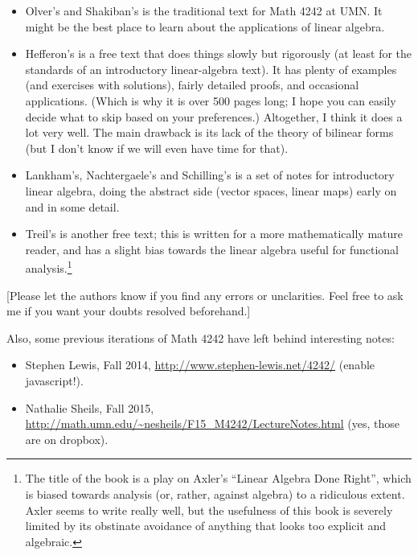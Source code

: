 \documentclass[numbers=enddot,12pt,final,onecolumn,notitlepage]{scrartcl}%
\theoremstyle{definition}
\begin{document}
\begin{itemize}
\item Olver's and Shakiban's \cite{OlvSha06} is the traditional text for Math
4242 at UMN. It might be the best place to learn about the applications of
linear algebra.

\item Hefferon's \cite{Heffer16} is a free text that does things slowly but
rigorously (at least for the standards of an introductory linear-algebra
text). It has plenty of examples (and exercises with solutions), fairly
detailed proofs, and occasional applications. (Which is why it is over 500
pages long; I hope you can easily decide what to skip based on your
preferences.) Altogether, I think it does a lot very well. The main drawback
is its lack of the theory of bilinear forms (but I don't know if we will even
have time for that).

\item Lankham's, Nachtergaele's and Schilling's \cite{LaNaSc16} is a set of
notes for introductory linear algebra, doing the abstract side (vector spaces,
linear maps) early on and in some detail.

\item Treil's \cite{Treil15} is another free text; this is written for a more
mathematically mature reader, and has a slight bias towards the linear algebra
useful for functional analysis.\footnote{The title of the book is a play on
Axler's \textquotedblleft Linear Algebra Done Right\textquotedblright, which
is biased towards analysis (or, rather, against algebra) to a ridiculous
extent. Axler seems to write really well, but the usefulness of this book is
severely limited by its obstinate avoidance of anything that looks too
explicit and algebraic.}
\end{itemize}

{\small [Please let the authors know if you find any errors or unclarities.
Feel free to ask me if you want your doubts resolved beforehand.]}

Also, some previous iterations of Math 4242 have left behind interesting notes:

\begin{itemize}
\item Stephen Lewis, Fall 2014, \url{http://www.stephen-lewis.net/4242/}
(enable javascript!).

\item Nathalie Sheils, Fall 2015,
\url{http://math.umn.edu/~nesheils/F15_M4242/LectureNotes.html} (yes, those
are on dropbox).
\end{itemize}
\end{document}
